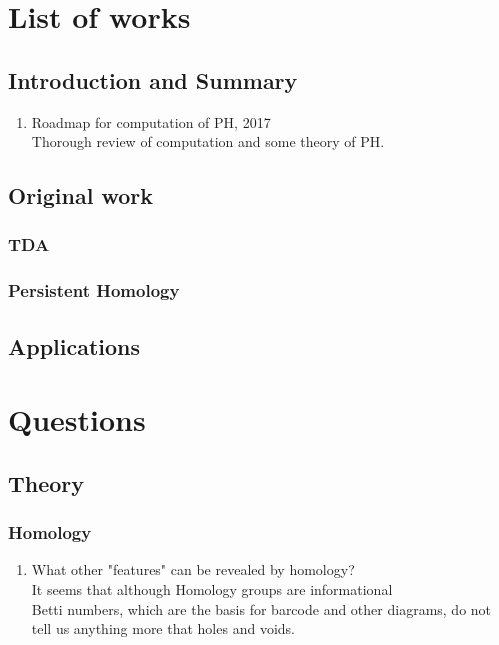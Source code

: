 \documentclass[10pt,a4paper]{article}
\begin{document}
\section{List of works}
\subsection{Introduction and Summary}
\begin{enumerate}
	\item \cite{Otter2017} Roadmap for computation of PH, 2017\\
		  Thorough review of computation and some theory of PH.
\end{enumerate}
\subsection{Original work}
\subsubsection{TDA}
\subsubsection{Persistent Homology}
\subsection{Applications}

\section{Questions}
\subsection{Theory}
\subsubsection{Homology}
\begin{enumerate}
	\item What other "features" can be revealed by homology?\\
		  It seems that although Homology groups are informational\\
		  Betti numbers, which are the basis for barcode and other diagrams, do not tell us anything more that holes and voids.\\
		  
\end{enumerate}
\end{document}
